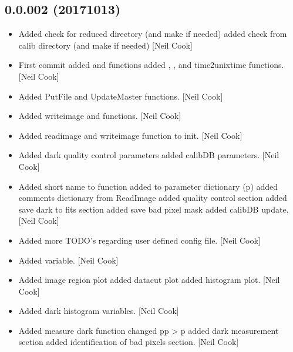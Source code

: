 \documentclass[a4paper,10pt,english]{report}
\begin{document}
\subsection{0.0.002 (2017\sphinxhyphen{}10\sphinxhyphen{}13)}
\label{\detokenize{misc/changelog:id568}}\begin{itemize}
\item {} 
Added check for reduced directory (and make if needed) added check
from calib directory (and make if needed) {[}Neil Cook{]}

\item {} 
First commit added  and  functions added
, , and time2unixtime
functions. {[}Neil Cook{]}

\item {} 
Added PutFile and UpdateMaster functions. {[}Neil Cook{]}

\item {} 
Added writeimage and  functions. {[}Neil Cook{]}

\item {} 
Added readimage and writeimage function to init. {[}Neil Cook{]}

\item {} 
Added dark quality control parameters added calibDB parameters. {[}Neil
Cook{]}

\item {} 
Added short name to  function added  to
parameter dictionary (p) added comments dictionary from ReadImage
added quality control section added save dark to fits section added
save bad pixel mask added calibDB update. {[}Neil Cook{]}

\item {} 
Added more TODO’s regarding user defined config file. {[}Neil Cook{]}

\item {} 
Added  variable. {[}Neil Cook{]}

\item {} 
Added image region plot added datacut plot added histogram plot. {[}Neil
Cook{]}

\item {} 
Added dark histogram variables. {[}Neil Cook{]}

\item {} 
Added measure dark function changed pp \textendash{}\textgreater{} p added dark measurement
section added identification of bad pixels section. {[}Neil Cook{]}

\end{itemize}
\end{document}
